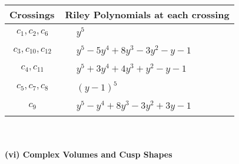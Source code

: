 \documentclass[1p]{elsarticle_modified}
\theoremstyle{definition}
\begin{document}
\begin{tabular}{m{50pt}|m{274pt}}
Crossings & \hspace{64pt}Riley Polynomials at each crossing \\
\hline $$\begin{aligned}c_{1},c_{2},c_{6}\end{aligned}$$&$\begin{aligned}
&y^5
\end{aligned}$\\
\hline $$\begin{aligned}c_{3},c_{10},c_{12}\end{aligned}$$&$\begin{aligned}
&y^5-5 y^4+8 y^3-3 y^2- y-1
\end{aligned}$\\
\hline $$\begin{aligned}c_{4},c_{11}\end{aligned}$$&$\begin{aligned}
&y^5+3 y^4+4 y^3+y^2- y-1
\end{aligned}$\\
\hline $$\begin{aligned}c_{5},c_{7},c_{8}\end{aligned}$$&$\begin{aligned}
&(y-1)^5
\end{aligned}$\\
\hline $$\begin{aligned}c_{9}\end{aligned}$$&$\begin{aligned}
&y^5- y^4+8 y^3-3 y^2+3 y-1
\end{aligned}$\\
\hline
\end{tabular}\\~\\
\newpage\flushleft \textbf{(vi) Complex Volumes and Cusp Shapes}
\end{document}
